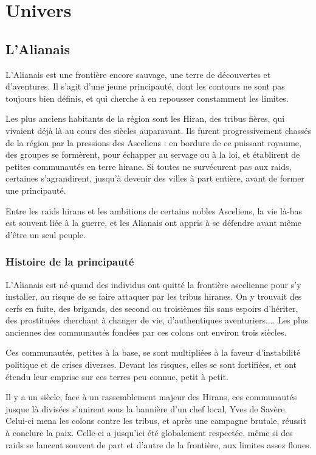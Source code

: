 \documentclass[10pt,a4paper,twocolumn]{book}
\begin{document}
\part{Univers}

\chapter{L'Alianais}
L'Alianais est une frontière encore sauvage, une terre de découvertes et d'aventures. Il s'agit d'une jeune principauté, dont les contours ne sont pas toujours bien définis, et qui cherche à en repousser constamment les limites.

Les plus anciens habitants de la région sont les Hiran, des tribus fières, qui vivaient déjà là au cours des siècles auparavant. Ils furent progressivement chassés de la région par la pressions des Asceliens : en bordure de ce puissant royaume, des groupes se formèrent, pour échapper au servage ou à la loi, et établirent de petites communautés en terre hirane. Si toutes ne survécurent pas aux raids, certaines s'agrandirent, jusqu'à devenir des villes à part entière, avant de former une principauté.

Entre les raids hirans et les ambitions de certains nobles Asceliens, la vie là-bas est souvent liée à la guerre, et les Alianais ont appris à se défendre avant même d'être un seul peuple.
\section{Histoire de la principauté}
L'Alianais est né quand des individus ont quitté la frontière ascelienne pour s'y installer, au risque de se faire attaquer par les tribus hiranes. On y trouvait des cerfs en fuite, des brigands, des second ou troisièmes fils sans espoirs d'hériter, des prostituées cherchant à changer de vie, d'authentiques aventuriers.... Les plus anciennes des communautés fondées par ces colons ont environ trois siècles.

Ces communautés, petites à la base, se sont multipliées à la faveur d'instabilité politique et de crises diverses. Devant les risques, elles se sont fortifiées, et ont étendu leur emprise sur ces terres peu connue, petit à petit. 

Il y a un siècle, face à un rassemblement majeur des Hirans, ces communautés jusque là divisées s'unirent sous la bannière d'un chef local, Yves de Savère. Celui-ci mena les colons contre les tribus, et après une campagne brutale, réussit à conclure la paix. Celle-ci a jusqu'ici été globalement respectée, même si des raids se lancent souvent de part et d'autre de la frontière, aux limites assez floues.
\end{document}
